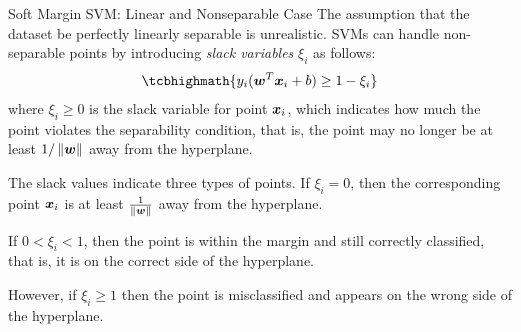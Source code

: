 \ifdefined\wox \begin{frame} \titlepage \end{frame} \fi

\begin{frame}{Soft Margin SVM: Linear and Nonseparable Case}
The assumption that the dataset be perfectly linearly
separable is unrealistic. 
SVMs can handle non-separable
points by introducing {\em slack variables} $\xi_i$ 
as follows: 
\begin{align*}
\tcbhighmath{
y_{i} (\bw^{T}\bx_{i}+b) \geq 1-\xi_{i}
}
\end{align*}
where $\xi_i \ge 0$ is the slack variable for point ${\boldsymbol x}_i$, which
indicates how much the point violates the separability condition,
that is, the point may no longer be at least $1/\left\lVert{\boldsymbol w}\right\rVert$ away
from the hyperplane. 

\medskip
The slack values indicate three types of
points. If $\xi_i=0$, then the corresponding point ${\boldsymbol x}_i$ is at least
$1 \over \|{\boldsymbol w}\|$ away from the hyperplane. 

\medskip
If $0 < \xi_i
< 1$, then the point is within the margin and still correctly
classif\/{i}ed, that is, it is on the correct side of the hyperplane.

\medskip
However, if $\xi_i \ge 1$ then the point is misclassif\/{i}ed and
appears on the wrong side of the hyperplane.
\end{frame}





